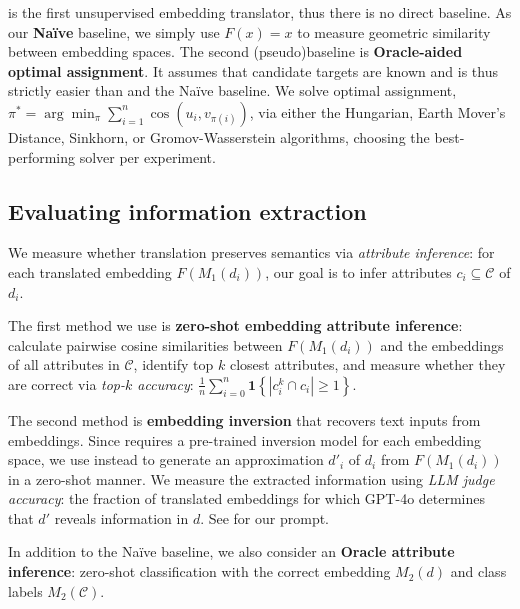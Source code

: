 \atk{} is the first unsupervised embedding translator, thus there is no direct baseline. As our \textbf{Naïve} baseline, we simply use $F(x)=x$ to measure geometric similarity between embedding spaces.  The second (pseudo)baseline is \textbf{Oracle-aided optimal assignment}.  It assumes that candidate targets are known and is thus strictly easier than \atk{} and the Naïve baseline.  We solve optimal assignment, $\pi^* = \arg\min_\pi \sum_{i=1}^n \cos(u_i, v_{\pi(i)})$, via either the Hungarian, Earth Mover’s Distance, Sinkhorn, or Gromov-Wasserstein algorithms, choosing the best-performing solver per experiment. 


\subsection{Evaluating information extraction}\label{sec:extracting_attributes}

We measure whether translation preserves semantics via \textit{attribute inference}:
for each translated embedding $F(M_1(d_i))$, our goal is to infer attributes $c_i \subseteq \mathcal{C}$ of $d_i$.

The first method we use is \textbf{zero-shot embedding attribute inference}: calculate pairwise cosine similarities between $F(M_1(d_i))$ and the embeddings of all attributes in $\mathcal{C}$, identify top $k$ closest attributes, and measure whether they are correct via \textit{top-$k$ accuracy}: $\frac{1}{n}\sum_{i=0}^{n}\mathbf{1}\left\{|c^k_i\cap c_i| \geq 1\right\}$.

The second method is \textbf{embedding inversion} that recovers text inputs from embeddings.  Since \cite{morris2023textembeddingsrevealalmost} requires a pre-trained inversion model for each embedding space, we use \cite{zhang2025universalzeroshotembeddinginversion} instead to generate an approximation $d'_i$ of $d_i$ from $F(M_1(d_i))$ in a zero-shot manner.  We measure the extracted information using \textit{LLM judge accuracy}: the fraction of translated embeddings for which GPT-4o determines that $d'$ reveals information in $d$. See  for our prompt. 

In addition to the Naïve baseline, we also consider an \textbf{Oracle attribute inference}: zero-shot classification with the correct embedding $M_2(d)$ and class labels $M_2(\mathcal{C})$.
 